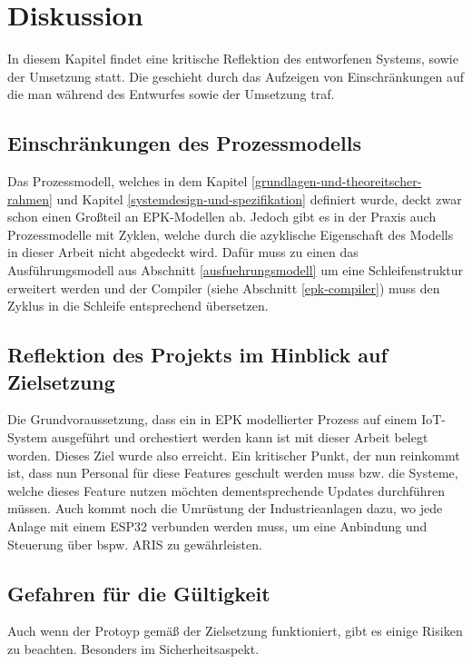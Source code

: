\chapter{Diskussion}

In diesem Kapitel findet eine kritische Reflektion des entworfenen Systems, sowie der Umsetzung statt. Die geschieht durch das Aufzeigen von Einschränkungen auf die man während 
des Entwurfes sowie der Umsetzung traf.

\section{Einschränkungen des Prozessmodells}

Das Prozessmodell, welches in dem Kapitel \ref{grundlagen-und-theoreitscher-rahmen} und Kapitel \ref{systemdesign-und-spezifikation} definiert wurde, deckt zwar schon einen Großteil an EPK-Modellen ab.
Jedoch gibt es in der Praxis auch Prozessmodelle mit Zyklen, welche durch die azyklische Eigenschaft des Modells in dieser Arbeit nicht abgedeckt wird. Dafür muss zu einen das Ausführungsmodell aus Abschnitt 
\ref{ausfuehrungsmodell} um eine Schleifenstruktur erweitert werden und der Compiler (siehe Abschnitt \ref{epk-compiler}) muss den Zyklus in die Schleife entsprechend übersetzen.

\section{Reflektion des Projekts im Hinblick auf Zielsetzung}
\label{reflection}

Die Grundvoraussetzung, dass ein in EPK modellierter Prozess auf einem IoT-System ausgeführt und orchestiert werden kann ist mit 
dieser Arbeit belegt worden. Dieses Ziel wurde also erreicht. Ein kritischer Punkt, der nun reinkommt ist, 
dass nun Personal für diese Features geschult werden muss bzw. die Systeme, welche dieses Feature nutzen möchten dementsprechende Updates 
durchführen müssen. Auch kommt noch die Umrüstung der Industrieanlagen dazu, wo jede Anlage mit einem ESP32 verbunden werden muss, um eine 
Anbindung und Steuerung über bspw. ARIS zu gewährleisten.

\section{Gefahren für die Gültigkeit}

Auch wenn der Protoyp gemäß der Zielsetzung funktioniert, gibt es einige Risiken zu beachten. Besonders
im Sicherheitsaspekt.


